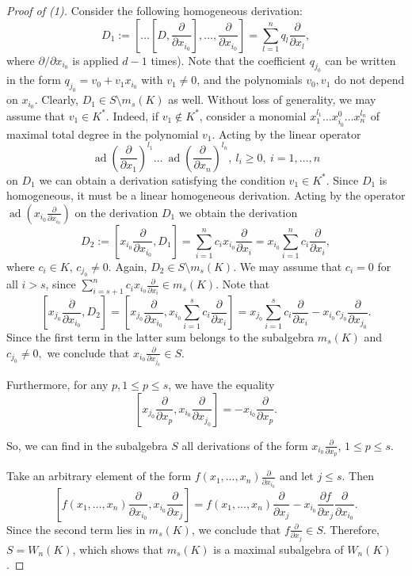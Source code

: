 \documentclass[10pt,a4paper]{amsart}
\DeclareMathOperator{\ad}{ad}
\begin{document}
\begin{proof}[Proof of (1)]
	Consider the  following homogeneous derivation:
	\[
	D_1 := 
	\left[ \dots \left[ D, \frac{\partial}{\partial x_{i_0}} \right], \dots, \frac{\partial}{\partial x_{i_0}} \right] = \sum_{l=1}^n q_l \frac{\partial}{\partial x_l}, 
	\]
	where $\partial/\partial x_{i_0}$  is applied  $d-1$ times).
	Note that the coefficient $ q_{j_0} $  can be written in the form $q_{j_0} = v_0 + v_1 x_{i_0}$ with $v_1 \neq 0$, and the polynomials $v_0, v_1$ do not depend on $x_{i_0}$.
	Clearly, $D_1 \in S \setminus m_s(K)$ as well.
	Without loss of generality, we may assume that $v_1 \in K^*$. Indeed, if $v_1 \notin K^*$,  consider
	a  monomial $x_1^{l_1} \dots x_{i_0}^0 \dots x_n^{l_n}$ of maximal total degree  in the polynomial $v_1$. Acting by the linear operator 
	$$\ad(\frac{\partial}{\partial x_1})^{l_1} \dots \ \ad(\frac{\partial}{\partial x_n})^{l_n}, \  l_i\geq 0, \  i=1, \ldots , n$$ on $D_1 $
	we can obtain a derivation satisfying the condition $v_1 \in K^*$.
	Since $D_1$ is  homogeneous, it must be a linear homogeneous derivation. Acting by the operator $\ad(x_{i_0} \frac{\partial}{\partial x_{i_0}})$
	on the derivation $D_1$ we obtain the derivation 
	\[
	D_2:= \left[x_{i_0} \frac{\partial}{\partial x_{i_0}}, D_1 \right] = \sum_{i=1}^n c_i x_{i_0} \frac{\partial}{\partial x_{i}}
	=  x_{i_0}\sum_{i=1}^n c_i \frac{\partial}{\partial x_{i}},
	\]
	where $c_i \in K$, $c_{j_0} \ne 0$.
	Again, $D_2 \in S \setminus m_s(K)$. We may assume that $c_i = 0$ for all $i > s$, since 
	$\sum_{i=s+1}^n c_i x_{i_0} \frac{\partial}{\partial x_{i}} \in m_s(K)$.
	Note that
	\[
	\left[x_{j_0} \frac{\partial}{\partial x_{i_0}}, D_2 \right] = 
	\left[ x_{j_0} \frac{\partial}{\partial x_{i_0}}, x_{i_0}\sum_{i=1}^{s} c_i \frac{\partial}{\partial x_i} \right] = 
	x_{j_0} \sum_{i=1}^{s} c_i \frac{\partial}{\partial x_i} - x_{i_0} c_{j_0} \frac{\partial}{\partial x_{j_0}}.
	\]
	Since the first term in the latter sum belongs to  the subalgebra $m_s(K)$ and $c_{j_0} \ne 0,$ we  conclude that 
	$x_{i_0} \frac{\partial}{\partial x_{j_0}} \in S$.
	
	Furthermore, for any $p, 1 \le p \le s $,  we have  the equality
	$$\left[ x_{j_0} \frac{\partial}{\partial x_p}, 
	x_{i_0} \frac{\partial}{\partial x_{j_0}} \right] = 
	-x_{i_0} \frac{\partial}{\partial x_p}.$$ 
	 
	So, we can find in the subalgebra $S$ all  derivations of the form $x_{i_0} \frac{\partial}{\partial x_p}$, $1 \le p \le s$.
	
	Take an arbitrary  element of the form $f(x_1, \dots, x_n) \frac{\partial}{\partial x_{i_0}}$ and let $j \le s$.
	Then 
	$$\left[ f(x_1, \dots, x_n) \frac{\partial}{\partial x_{i_0}}, 
	x_{i_0} \frac{\partial}{\partial x_{j}} \right] = 
	f(x_1, \dots, x_n) \frac{\partial}{\partial x_{j}} - 
	x_{i_0} \frac{\partial f}{\partial x_j} \frac{\partial}{\partial x_{i_0}}.$$
	Since the second term lies in $m_s(K)$, 
	we conclude that $f \frac{\partial}{\partial x_{j}} \in S$. Therefore, $S = W_n(K)$, which shows that  
	$m_s(K)$ is a maximal subalgebra of $W_n(K)$.
\end{proof}
\end{document}
